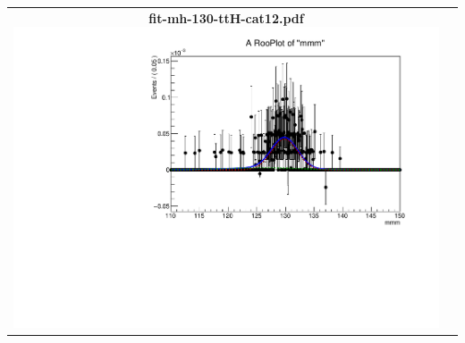 \begin{longtable}{|c|c|}
{}
 \\
\hline
\parbox{0.49\textwidth}{
\centering
{\bfseries fit-mh-130-ttH-cat12.pdf}
\includegraphics[width=.49\textwidth]{figures/signal_model/AppendixBdt/ttH/130/fit_mh_130_ttH_cat12.pdf}
}
 & \\ \hline
\end{longtable}
